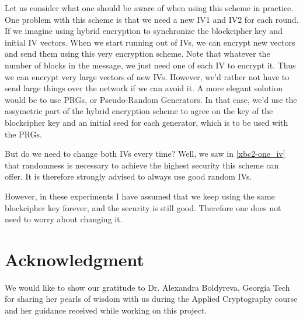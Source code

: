 \documentclass[conference]{IEEEtran}
\begin{document}
Let us consider what one should be aware of when using this scheme in practice. One problem with this scheme is that we need a new IV1 and IV2 for each round. If we imagine using hybrid encryption to synchronize the blockcipher key and initial IV vectors. When we start running out of IVs, we can encrypt new vectors and send them using this very encryption scheme. Note that whatever the number of blocks in the message, we just need one of each IV to encrypt it. Thus we can encrypt very large vectors of new IVs. However, we'd rather not have to send large things over the network if we can avoid it. A more elegant solution would be to use PRGs, or Pseudo-Random Generators. In that case, we'd use the assymetric part of the hybrid encryption scheme to agree on the key of the blockcipher key and an initial seed for each generator, which is to be used with the PRGs.

But do we need to change both IVs every time? Well, we saw in \ref{xbc2-one_iv} that randomness is necessary to achieve the highest security this scheme can offer. It is therefore strongly advised to always use good random IVs.

However, in these experiments I have assumed that we keep using the same blockcipher key forever, and the security is still good. Therefore one does not need to worry about changing it.



\section*{Acknowledgment}

We would like to show our gratitude to Dr. Alexandra Boldyreva, Georgia Tech for sharing her pearls of wisdom with us during the Applied Cryptography course and her guidance received while working on this project.







\end{document}
